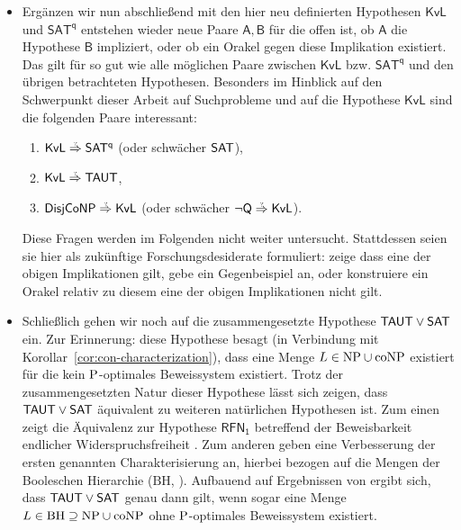 \begin{itemize}[parsep=0pt,listparindent=\parindent,itemsep=5pt plus 1pt minus 1pt,midpenalty=0]
    \item Ergänzen wir nun abschließend mit den hier neu definierten Hypothesen $\mathsf{KvL}$ und $\mathsf{SAT^{q}}$ entstehen wieder neue Paare $\mathsf{A,B}$ für die offen ist, ob $\mathsf A$ die Hypothese $\mathsf B$ impliziert, oder ob ein Orakel gegen diese Implikation existiert. Das gilt für so gut wie alle möglichen Paare zwischen $\mathsf{KvL}$ bzw. $\mathsf{SAT^{q}}$ und den übrigen betrachteten Hypothesen. 
        Besonders im Hinblick auf den Schwerpunkt dieser Arbeit auf Suchprobleme und auf die Hypothese $\mathsf{KvL}$ sind die folgenden Paare interessant:
        \begin{enumerate}[noitemsep,resume,label=(\roman*)]
            \item $\mathsf{KvL}\stackrel{\smash{\text{\raisebox{-1pt}{\tiny ?}}}}{\Rightarrow}\mathsf{SAT^{q}}$ (oder schwächer $\hSAT$),
            \item $\mathsf{KvL}\stackrel{\smash{\text{\raisebox{-1pt}{\tiny ?}}}}{\Rightarrow}\hTAUT$,
            \item $\hDisjCoNP\stackrel{\smash{\text{\raisebox{-1pt}{\tiny ?}}}}{\Rightarrow}\mathsf{KvL}$ (oder schwächer $\neg\hQ\stackrel{\smash{\text{\raisebox{-1pt}{\tiny ?}}}}{\Rightarrow}\mathsf{KvL}$).
        \end{enumerate}
        Diese Fragen werden im Folgenden nicht weiter untersucht. Stattdessen seien sie hier als zukünftige Forschungsdesiderate formuliert: zeige dass eine der obigen Implikationen gilt, gebe ein Gegenbeispiel an, oder konstruiere ein Orakel relativ zu diesem eine der obigen Implikationen nicht gilt.

    \item Schließlich gehen wir noch auf die zusammengesetzte Hypothese $\hTAUT\lor\hSAT$ ein. Zur Erinnerung: diese Hypothese besagt (in Verbindung mit Korollar~\ref{cor:con-characterization}), dass eine Menge $L\in\NP\cup\coNP$ existiert für die kein $\P$-optimales Beweissystem existiert.
        Trotz der zusammengesetzten Natur dieser Hypothese lässt sich zeigen, dass $\hTAUT\lor\hSAT$ äquivalent zu weiteren natürlichen Hypothesen ist.
        Zum einen zeigt \textcite[Thm.~3.2]{khaniki_new_2022} die Äquivalenz zur Hypothese $\mathsf{RFN_1}$ betreffend der Beweisbarkeit endlicher Widerspruchsfreiheit \parencites(vgl.)(){pudlak_incompleteness_2017}.
        Zum anderen geben \textcite{egidy_upward_2023} eine Verbesserung der ersten genannten Charakterisierung an, hierbei bezogen auf die Mengen der Booleschen Hierarchie ($\mathrm{BH}$, \cites(vgl.)(){cai_boolean_1986}{cai_boolean_1988}{cai_boolean_1989}). Aufbauend auf Ergebnissen von \textcite{kobler_optimal_2003} ergibt sich, dass $\hTAUT\lor\hSAT$ genau dann gilt, wenn sogar eine Menge $L \in \mathrm{BH}\supseteq \NP\cup\coNP$ ohne $\P$-optimales Beweissystem existiert.


\end{itemize}
